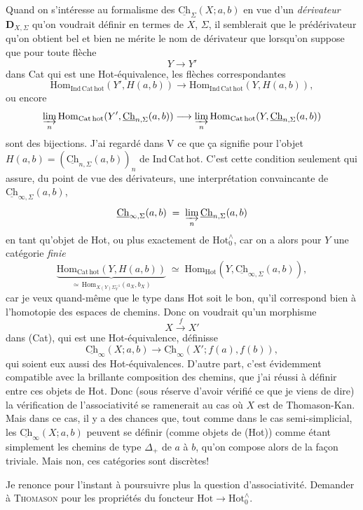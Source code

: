 \documentclass[11pt]{article}
\newcommand{\printedpage}[1]{\marginpar{\footnotesize p.~#1}}
\newcommand{\msp}[1]{\marginpar{\footnotesize [#1]}}
\newcommand{\Ch}{\underline{\mathrm{Ch}}}
\newcommand{\Hot}{\mathrm{Hot}}
\begin{document}
Quand on s'intéresse au formalisme des $\Ch_\Sigma(X;a,b)$ en vue d'un \textit{dérivateur} $\mathbf{D}_{X,\Sigma}$ qu'on voudrait définir en termes de $X$, $\Sigma$, il semblerait que le prédérivateur qu'on obtient bel et bien ne mérite le nom de dérivateur que lorsqu'on suppose que pour toute flèche
\[ Y\longrightarrow Y' \]
dans Cat qui est une Hot-équivalence, les flèches correspondantes
\[ \mathrm{Hom}_{\mathrm{Ind\,Cat\,hot}}(Y',H(a,b)) \longrightarrow \mathrm{Hom}_{\mathrm{Ind\,Cat\,hot}}(Y,H(a,b)), \]
ou encore
\[ \varinjlim_n \mathrm{Hom}_{\mathrm{Cat\,hot}}(Y',\Ch_{n,\Sigma}(a,b)) \longrightarrow \varinjlim_n \mathrm{Hom}_{\mathrm{Cat\,hot}}(Y,\Ch_{n,\Sigma}(a,b)) \]
sont des bijections. J'ai regardé dans V ce que ça signifie pour l'objet $H(a,b) = (\Ch_{n,\Sigma}(a,b))_n$ de Ind\,Cat\,hot. C'est cette condition seulement qui assure, du point de vue des dérivateurs, une interprétation convaincante de $\Ch_{\infty,\Sigma}(a,b)$,
\[ \Ch_{\infty,\Sigma}(a,b) \;=\; \varinjlim_n \Ch_{n,\Sigma}(a,b) \]
en tant qu'objet de Hot, ou plus exactement de $\Hot^{\wedge}_{0}$, car on a alors pour $Y$ une catégorie \textit{finie}
\[ \underbrace{\mathrm{Hom}_{\mathrm{Cat\,hot}}(Y,H(a,b))}_{\simeq\,\mathrm{Hom}_{X(Y)\Sigma_Y^{-1}}(a_X,b_X)} \;\simeq\; \mathrm{Hom}_{\Hot}(Y,\Ch_{\infty,\Sigma}(a,b)), \]
\msp{page 130}
car je veux quand-même que le type dans Hot soit le bon, qu'il correspond bien à l'homotopie des espaces de chemins. Donc on voudrait qu'un morphisme
\[ X\xrightarrow{\;f\;}X' \]
dans (Cat), qui est une Hot-équivalence, définisse
\[ \Ch_\infty(X;a,b) \longrightarrow \Ch_\infty(X';f(a),f(b)), \]
qui soient eux aussi des Hot-équivalences. D'autre part, c'est évidemment compatible avec la brillante composition des chemins, que j'ai réussi à définir entre ces objets de Hot. Donc (sous réserve d'avoir vérifié ce que je viens de dire) la vérification de l'associativité se ramenerait au cas où $X$ est de Thomason-Kan. Mais dans ce cas, il y a des chances que, tout comme dans le cas semi-simplicial, les $\Ch_\infty(X;a,b)$ peuvent se définir (comme objets de (Hot)) comme étant simplement les chemins de type $\Delta_+$ de $a$ à $b$, qu'on compose alors de la façon triviale. Mais non, ces catégories sont discrètes! %

Je renonce pour l'instant à poursuivre plus la question d'associativité. Demander à \textsc{Thomason} pour les propriétés du foncteur $\Hot\longrightarrow\Hot^{\wedge}_{0}$.

\clearpage
\printedpage{82}
\end{document}
